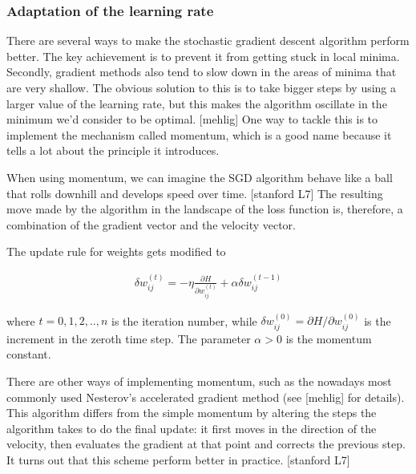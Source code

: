 \subsubsection{Adaptation of the learning rate}

There are several ways to make the stochastic gradient descent algorithm perform better. The key achievement is to prevent it from getting stuck in local minima. Secondly, gradient methods also tend to slow down in the areas of minima that are very shallow. The obvious solution to this is to take bigger steps by using a larger value of the learning rate, but this makes the algorithm oscillate in the minimum we'd consider to be optimal. [mehlig] One way to tackle this is to implement the mechanism called momentum, which is a good name because it tells a lot about the principle it introduces. 

When using momentum, we can imagine the SGD algorithm behave like a ball that rolls downhill and develops speed over time. [stanford L7] The resulting move made by the algorithm in the landscape of the loss function is, therefore, a combination of the gradient vector and the velocity vector. 

\noindent The update rule for weights gets modified to

\begin{gather}
\delta w_{ij}^{(t)} = - \eta \frac{\partial H}{\partial w_{ij}^{(t)}} + \alpha \delta w_{ij}^{(t-1)} 
\end{gather}

\noindent where $ t=0,1,2,..,n $ is the iteration number, while $ \delta w_{ij}^{(0)} = \partial H / \partial w_{ij}^{(0)} $ is the increment in the zeroth time step. The parameter $ \alpha > 0$ is the momentum constant. 

There are other ways of implementing momentum, such as the nowadays most commonly used Nesterov's accelerated gradient method (see [mehlig] for details). This algorithm differs from the simple momentum by altering the steps the algorithm takes to do the final update: it first moves in the direction of the velocity, then evaluates the gradient at that point and corrects the previous step. It turns out that this scheme perform better in practice. [stanford L7]


